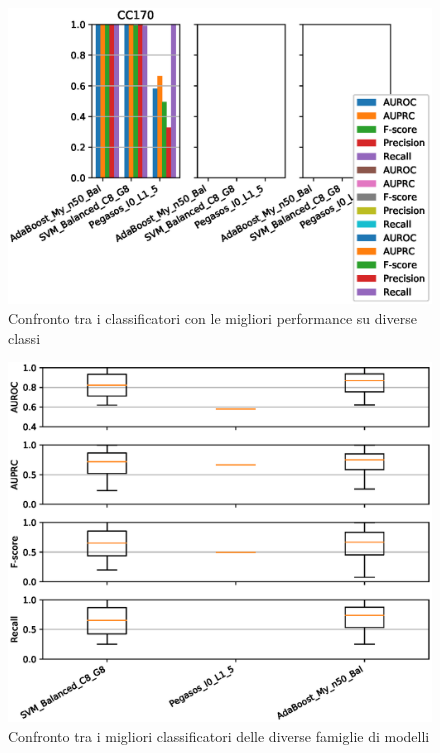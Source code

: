 \documentclass[12pt,a4paper,oneside,hidelinks]{report}
\begin{document}
\begin{figure}[ht]%
    \centering
    \includegraphics[scale = 0.80]{CC-level2.eps}%
    \caption{Confronto tra i classificatori con le migliori performance su diverse classi}%
    \label{fig:liv2}%
\end{figure}

\vspace*{\fill}



\vspace*{\fill}

\begin{figure}[ht]%
    \centering
    \includegraphics[scale = 0.80]{CC-level3.eps}%
    \caption{Confronto tra i migliori classificatori delle diverse famiglie di modelli}%
    \label{fig:liv3} 
\end{figure}
\end{document}
